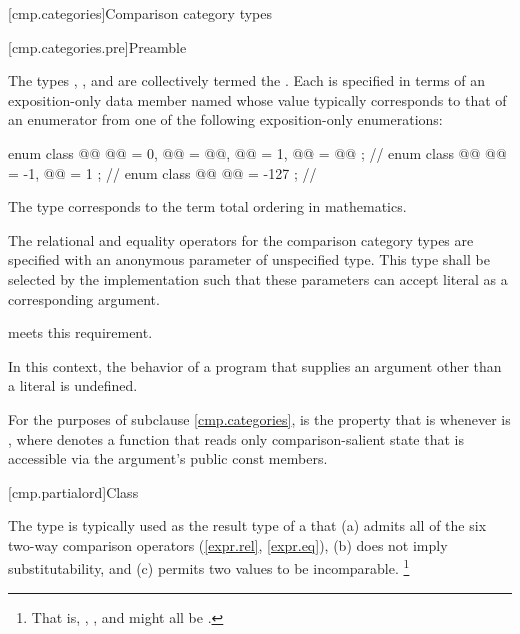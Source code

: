 [cmp.categories]{Comparison category types}

[cmp.categories.pre]{Preamble}

\pnum
The types
,
, and
are collectively termed the .
Each is specified in terms of an exposition-only data member named 
whose value typically corresponds to that of an enumerator
from one of the following exposition-only enumerations:

\begin{codeblock}
enum class @@ { @@ = 0, @@ = @@,
                @@ = 1, @@ = @@ };   // \expos
enum class @@ { @@ = -1, @@ = 1 };                  // \expos
enum class @@ { @@ = -127 };                       // \expos
\end{codeblock}

\pnum
\begin{note}
The type 
corresponds to the term
total ordering in mathematics.
\end{note}

\pnum
The relational and equality operators for the comparison category types
are specified with an anonymous parameter of unspecified type.
This type shall be selected by the implementation such that
these parameters can accept literal  as a corresponding argument.
\begin{example}
meets this requirement.
\end{example}
In this context, the behavior of a program that supplies
an argument other than a literal  is undefined.

\pnum
For the purposes of subclause \ref{cmp.categories},
 is the property that  is 
whenever  is ,
where  denotes a function that reads only comparison-salient state
that is accessible via the argument's public const members.

[cmp.partialord]{Class }

\pnum
The  type is typically used
as the result type of a 
that (a) admits all of the six two-way comparison operators (\ref{expr.rel}, \ref{expr.eq}),
(b) does not imply substitutability,
and (c) permits two values to be incomparable.%
\footnote{That is, , , and  might all be .}

